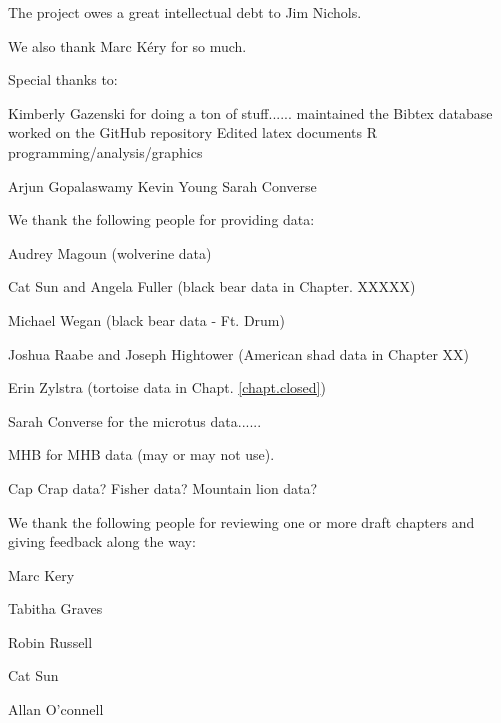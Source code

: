 The project owes a great intellectual debt to Jim Nichols. 

We also thank Marc K\'{e}ry for so much.


Special thanks to:

Kimberly Gazenski for doing a ton of stuff......
maintained the Bibtex database
worked on the GitHub repository
Edited latex documents
R programming/analysis/graphics

Arjun Gopalaswamy
Kevin Young 
Sarah Converse



We thank the following people for providing data:

Audrey Magoun (wolverine data)

Cat Sun and Angela Fuller (black bear data in Chapter. XXXXX)

Michael Wegan (black bear data - Ft. Drum)

Joshua Raabe and Joseph Hightower (American shad data in Chapter XX)

Erin Zylstra (tortoise data in Chapt. \ref{chapt.closed})

Sarah Converse for the microtus data......

MHB for MHB data (may or may not use).

Cap Crap data? Fisher data?  Mountain lion data?


We thank the following people for reviewing one or more draft chapters
and giving feedback along the way:

Marc Kery

Tabitha Graves

Robin Russell

Cat Sun

Allan O'connell

